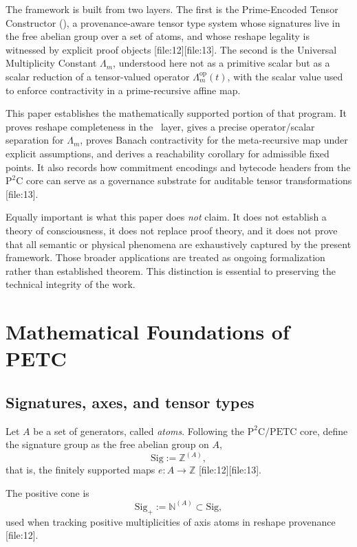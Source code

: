 \documentclass[11pt,a4paper]{article}
\newcommand{\Sig}{\mathrm{Sig}}
\newcommand{\Nat}{\mathbb{N}}
\newcommand{\Int}{\mathbb{Z}}
\newcommand{\op}{\mathrm{op}}
\newcommand{\PETC}{\mathrm{PETC}}
\begin{document}
The framework is built from two layers. The first is the Prime-Encoded Tensor Constructor (\PETC), a provenance-aware tensor type system whose signatures live in the free abelian group over a set of atoms, and whose reshape legality is witnessed by explicit proof objects [file:12][file:13]. The second is the Universal Multiplicity Constant \(\Lambda_m\), understood here not as a primitive scalar but as a scalar reduction of a tensor-valued operator \(\Lambda_m^{\op}(t)\), with the scalar value used to enforce contractivity in a prime-recursive affine map.

This paper establishes the mathematically supported portion of that program. It proves reshape completeness in the \PETC\ layer, gives a precise operator/scalar separation for \(\Lambda_m\), proves Banach contractivity for the meta-recursive map under explicit assumptions, and derives a reachability corollary for admissible fixed points. It also records how commitment encodings and bytecode headers from the \(\mathrm{P}^2\mathrm{C}\) core can serve as a governance substrate for auditable tensor transformations [file:13].

Equally important is what this paper does \emph{not} claim. It does not establish a theory of consciousness, it does not replace proof theory, and it does not prove that all semantic or physical phenomena are exhaustively captured by the present framework. Those broader applications are treated as ongoing formalization rather than established theorem. This distinction is essential to preserving the technical integrity of the work.

\section{Mathematical Foundations of PETC}

\subsection{Signatures, axes, and tensor types}

Let \(A\) be a set of generators, called \emph{atoms}. Following the \(\mathrm{P}^2\mathrm{C}/\PETC\) core, define the signature group as the free abelian group on \(A\),
\[
\Sig := \Int^{(A)},
\]
that is, the finitely supported maps \(e : A \to \Int\) [file:12][file:13].

The positive cone is
\[
\Sig_+ := \Nat^{(A)} \subset \Sig,
\]
used when tracking positive multiplicities of axis atoms in reshape provenance [file:12].
\end{document}
